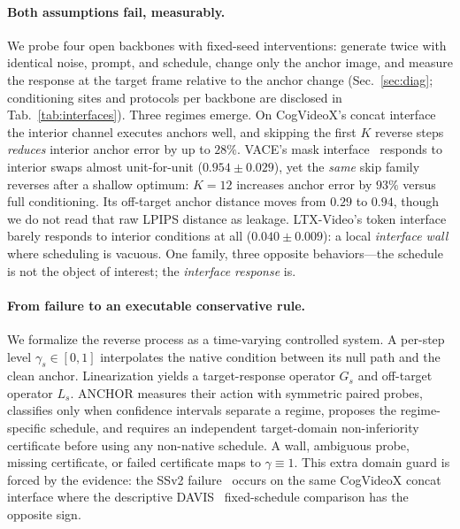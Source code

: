 \documentclass[letterpaper]{article}
\begin{document}
\paragraph{Both assumptions fail, measurably.}
We probe four open backbones with fixed-seed interventions: generate twice
with identical noise, prompt, and schedule, change only the anchor image,
and measure the response at the target frame relative to the anchor change
(Sec.~\ref{sec:diag}; conditioning sites and protocols per backbone are
disclosed in Tab.~\ref{tab:interfaces}). Three regimes emerge. On
CogVideoX's concat interface~\citep{yang2024cogvideox} the interior
channel executes anchors well, and skipping the first $K$ reverse steps
\emph{reduces} interior anchor error by up to $28\%$. VACE's mask
interface~\citep{jiang2025vace} responds to interior swaps almost
unit-for-unit ($0.954{\pm}0.029$), yet the \emph{same} skip family reverses
after a shallow optimum: $K{=}12$ increases anchor error by $93\%$ versus
full conditioning. Its off-target anchor distance moves from $0.29$ to
$0.94$, though we do not read that raw LPIPS distance as leakage. LTX-Video's token
interface~\citep{hacohen2025ltx} barely responds to interior conditions at
all ($0.040{\pm}0.009$): a local \emph{interface wall} where scheduling is
vacuous. One family, three opposite behaviors---the schedule is not the
object of interest; the \emph{interface response} is.

\paragraph{From failure to an executable conservative rule.}
We formalize the reverse process as a time-varying controlled system. A
per-step level $\gamma_s\in[0,1]$ interpolates the native condition between
its null path and the clean anchor. Linearization yields a target-response
operator $G_s$ and off-target operator $L_s$. ANCHOR measures their action
with symmetric paired probes, classifies only when confidence intervals
separate a regime, proposes the regime-specific schedule, and requires an
independent target-domain non-inferiority certificate before using any
non-native schedule. A wall, ambiguous probe, missing certificate, or failed
certificate maps to $\gamma\equiv1$. This extra domain guard is forced by
the evidence: the SSv2 failure~\citep{goyal2017something} occurs on the same CogVideoX concat interface
where the descriptive DAVIS~\citep{perazzi2016davis} fixed-schedule comparison has the opposite sign.
\end{document}
